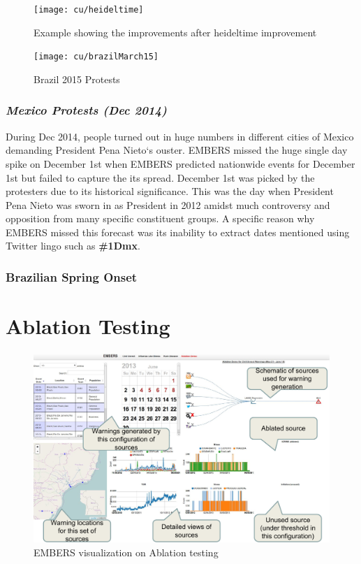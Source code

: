\begin{figure}
\texttt{[image: cu/heideltime]}
\caption{Example showing the improvements after heideltime improvement}
\label{fig:heideltime}
\end{figure}


\begin{figure}[H]
\centering
\texttt{[image: cu/brazilMarch15]}
\caption{Brazil 2015 Protests}
\label{fig:brazilSpring}
\end{figure}

\subsubsection{\it Mexico Protests (Dec 2014)}
During Dec 2014, people turned out in huge numbers in different cities of Mexico demanding
President Pena Nieto`s ouster. 
EMBERS missed the huge single day spike on December 1st when
EMBERS predicted nationwide events for December 1st but failed to
capture the its spread.  
December 1st was picked by the protesters due to
its historical significance. This was the day when President Pena Nieto was sworn
in as President in 2012 amidst much controversy and opposition from
many specific constituent groups. A specific reason why EMBERS missed this forecast
was its inability to extract dates mentioned using Twitter lingo such as {\bf \#1Dmx}.

\subsubsection{Brazilian Spring Onset}

\section{Ablation Testing}
\begin{figure}
\includegraphics[width=\columnwidth]{figures/cu/ablation.pdf}
\caption{EMBERS visualization on Ablation testing}
\label{fig:ablation}
\end{figure}
